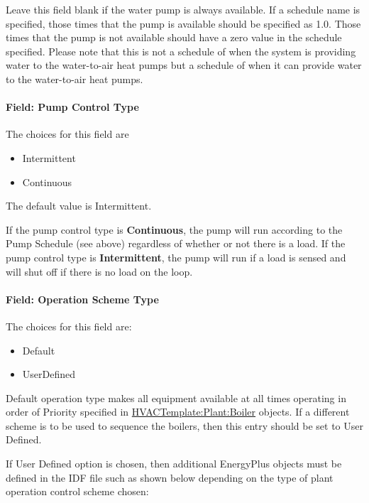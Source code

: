 Leave this field blank if the water pump is always available. If a schedule name is specified, those times that the pump is available should be specified as 1.0. Those times that the pump is not available should have a zero value in the schedule specified. Please note that this is not a schedule of when the system is providing water to the water-to-air heat pumps but a schedule of when it can provide water to the water-to-air heat pumps.

\paragraph{Field: Pump Control Type}\label{field-pump-control-type-2}

The choices for this field are

\begin{itemize}
\item
  Intermittent
\item
  Continuous
\end{itemize}

The default value is Intermittent.

If the pump control type is \textbf{Continuous}, the pump will run according to the Pump Schedule (see above) regardless of whether or not there is a load. If the pump control type is \textbf{Intermittent}, the pump will run if a load is sensed and will shut off if there is no load on the loop.

\paragraph{Field: Operation Scheme Type}\label{field-operation-scheme-type}

The choices for this field are:

\begin{itemize}
\item
  Default
\item
  UserDefined
\end{itemize}

Default operation type makes all equipment available at all times operating in order of Priority specified in \hyperref[hvactemplateplantboiler]{HVACTemplate:Plant:Boiler} objects. If a different scheme is to be used to sequence the boilers, then this entry should be set to User Defined.

If User Defined option is chosen, then additional EnergyPlus objects must be defined in the IDF file such as shown below depending on the type of plant operation control scheme chosen:

